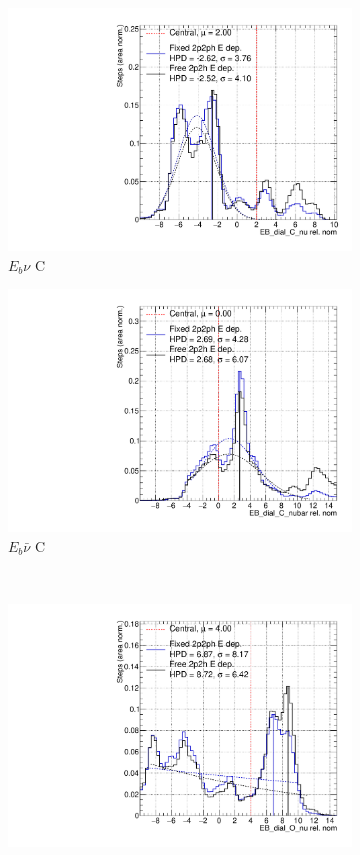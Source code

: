 \begin{figure}
\centering
\begin{subfigure}{.48\textwidth}
  \centering
  \includegraphics[width=0.73\linewidth]{figs/2p2h_EB_dial_C_nu}
  \caption{$E_{b}\nu$ C}
\end{subfigure}
\begin{subfigure}{.48\textwidth}
  \centering
  \includegraphics[width=0.73\linewidth]{figs/2p2h_EB_dial_C_nubar}
  \caption{$E_{b}\bar{\nu}$ C}
\end{subfigure} \\
\begin{subfigure}{.48\textwidth}
  \centering
  \includegraphics[width=0.73\linewidth]{figs/2p2h_EB_dial_O_nu}

\end{subfigure}
\end{figure}
